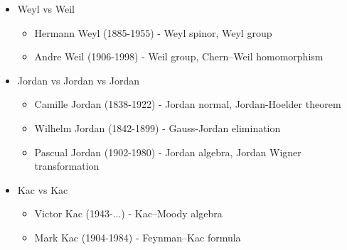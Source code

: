 \documentclass[10pt,a4paper]{article}
\theoremstyle{definition}
\begin{document}
\begin{itemize}
\item Weyl vs Weil
    \begin{itemize}
    \item {\sc Hermann Weyl} (1885-1955) - Weyl spinor, Weyl group
    \item {\sc Andre Weil} (1906-1998) - Weil group, Chern–Weil homomorphism
    \end{itemize}
\item Jordan vs Jordan vs Jordan
    \begin{itemize}
    \item {\sc Camille Jordan} (1838-1922) - Jordan normal, Jordan-Hoelder theorem
    \item {\sc Wilhelm Jordan} (1842-1899) - Gauss-Jordan elimination
    \item {\sc Pascual Jordan} (1902-1980) - Jordan algebra, Jordan Wigner transformation
    \end{itemize}
\item Kac vs Kac
    \begin{itemize}
    \item {\sc Victor Kac} (1943-...) - Kac–Moody algebra
    \item {\sc Mark Kac} (1904-1984) - Feynman–Kac formula
    \end{itemize}
\end{itemize}
\end{document}

